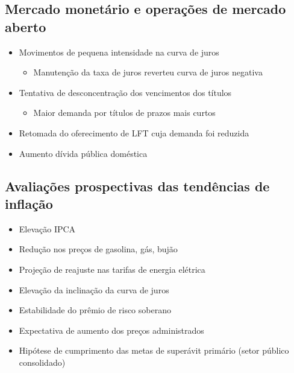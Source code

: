 \documentclass[11pt]{article}
\begin{document}
\subsection*{Mercado monetário e operações de mercado aberto}
\label{sec:orgaa2a312}
\begin{itemize}
\item Movimentos de pequena intensidade na curva de juros
\begin{itemize}
\item Manutenção da taxa de juros reverteu curva de juros negativa
\end{itemize}
\item Tentativa de desconcentração dos vencimentos dos títulos 
\begin{itemize}
\item Maior demanda por títulos de prazos mais curtos
\end{itemize}
\item Retomada do oferecimento de LFT cuja demanda foi reduzida
\item Aumento dívida pública doméstica
\end{itemize}
\subsection*{Avaliações prospectivas das tendências de inflação}
\label{sec:org92c0168}

\begin{itemize}
\item Elevação IPCA
\item Redução nos preços de gasolina, gás, bujão
\item Projeção de reajuste nas tarifas de energia elétrica
\item Elevação da inclinação da curva de juros
\item Estabilidade do prêmio de risco soberano
\item Expectativa de aumento dos preços administrados
\item Hipótese de cumprimento das metas de superávit primário (setor público consolidado)
\end{itemize}
\end{document}

